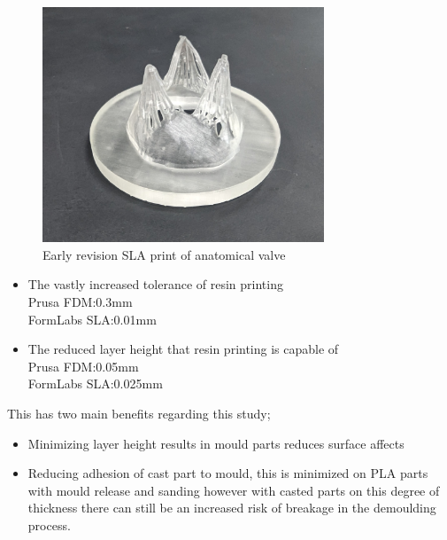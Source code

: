 \begin{figure}[H]
    \centering
    \includegraphics[width=0.75\textwidth]{figures/resinprintanat.jpg}
    \caption{Early revision \gls{SLA} print of anatomical valve}
    \label{fig:reso}
\end{figure}
\begin{itemize}
    \item The vastly increased tolerance of resin printing\\
          Prusa \gls{FDM}:0.3mm\\
          FormLabs \gls{SLA}:0.01mm
    \item The reduced layer height that resin printing is capable of\\
          Prusa \gls{FDM}:0.05mm\\
          FormLabs \gls{SLA}:0.025mm
\end{itemize}
This has two main benefits regarding this study;
\begin{itemize}
    \item Minimizing layer height results in mould parts reduces surface affects
    \item Reducing adhesion of cast part to mould, this is minimized on \gls{PLA} parts with mould release and sanding however with casted parts on this degree of thickness there can still be an increased risk of breakage in the demoulding process.
\end{itemize}
